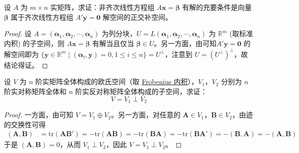 \documentclass[../../main.tex]{subfiles}%
\begin{document}
\begin{proposition}\label{proposition:例9.21}
设 $A$ 为 $m \times n$ 实矩阵，求证：非齐次线性方程组 $A\boldsymbol{x} = \boldsymbol{\beta}$ 有解的充要条件是向量 $\boldsymbol{\beta}$ 属于齐次线性方程组 $A'\boldsymbol{y} = \boldsymbol{0}$ 解空间的正交补空间。
\end{proposition}
\begin{proof}

设 $A = (\boldsymbol{\alpha}_1, \boldsymbol{\alpha}_2, \cdots, \boldsymbol{\alpha}_n)$ 为列分块，$U = L(\boldsymbol{\alpha}_1, \boldsymbol{\alpha}_2, \cdots, \boldsymbol{\alpha}_n)$ 为 $\mathbb{R}^m$ (取标准内积) 的子空间，则 $A\boldsymbol{x} = \boldsymbol{\beta}$ 有解当且仅当 $\boldsymbol{\beta} \in U$。另一方面，由可知$A'\boldsymbol{y} = \boldsymbol{0}$ 的解空间即为 $\{\boldsymbol{y} \in \mathbb{R}^m \mid (\boldsymbol{\alpha}_i, \boldsymbol{y}) = 0, 1 \leqslant  i \leqslant  n\} = U^{\perp}$，注意到 $U = (U^{\perp})^{\perp}$，故结论得证。

\end{proof}

\begin{proposition}\label{proposition:例9.22}
设 $V$ 为 $n$ 阶实矩阵全体构成的欧氏空间（取 \hyperlink{Frobenius 内积}{Frobenius 内积}），$V_1$，$V_2$ 分别为 $n$ 阶实对称矩阵全体和 $n$ 阶实反对称矩阵全体构成的子空间，求证：
\[ V = V_1 \perp V_2 \]
\end{proposition}
\begin{proof}

一方面，由可知 $V = V_1 \oplus V_2$。另一方面，对任意的 $\boldsymbol{A} \in V_1$，$\boldsymbol{B} \in V_2$，由迹的交换性可得
\begin{align*}
(\boldsymbol{A}, \boldsymbol{B}) &= \mathrm{tr}(\boldsymbol{A}\boldsymbol{B}') = -\mathrm{tr}(\boldsymbol{A}\boldsymbol{B}) = -\mathrm{tr}(\boldsymbol{B}\boldsymbol{A}) = -\mathrm{tr}(\boldsymbol{B}\boldsymbol{A}') = -(\boldsymbol{B}, \boldsymbol{A}) = -(\boldsymbol{A}, \boldsymbol{B})
\end{align*}
于是 $(\boldsymbol{A}, \boldsymbol{B}) = 0$，从而 $V_1 \perp V_2$，因此 $V = V_1 \perp V_2$。

\end{proof}
\end{document}
